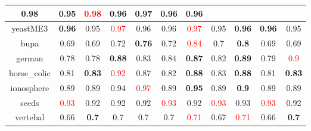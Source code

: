 \documentclass{article}%
\begin{document}
\begin{tabular}{c|cccccccccc}
{0.98
}&0.95&\textcolor{red}{ 
0.98
}&0.96&\textbf{0.97}&0.96&0.96\\%
\hline%
yeastME3&\textbf{0.96}&0.95&\textcolor{red}{ 
0.97
}&0.96&0.96&\textcolor{red}{ 
0.97
}&0.95&\textbf{0.96}&\textbf{0.96}&0.95\\%
\hline%
bupa&0.69&0.69&0.72&\textbf{0.76}&0.72&\textcolor{red}{ 
0.84
}&0.7&\textbf{0.8}&0.69&0.69\\%
\hline%
german&0.78&0.78&\textbf{0.88}&0.83&0.84&\textbf{0.87}&0.82&\textbf{0.89}&0.79&\textcolor{red}{ 
0.9
}\\%
\hline%
horse\_colic&0.81&\textbf{0.83}&\textcolor{red}{ 
0.92
}&0.87&0.82&\textbf{0.88}&0.83&\textbf{0.88}&0.81&\textbf{0.83}\\%
\hline%
ionosphere&0.89&0.89&0.94&\textcolor{red}{ 
0.97
}&0.89&\textbf{0.95}&0.89&\textbf{0.9}&0.89&0.89\\%
\hline%
seeds&\textcolor{red}{ 
0.93
}&0.92&0.92&0.92&\textcolor{red}{ 
0.93
}&0.92&\textcolor{red}{ 
0.93
}&0.93&\textcolor{red}{ 
0.93
}&0.92\\%
\hline%
vertebal&0.66&\textbf{0.7}&0.7&0.7&0.7&\textcolor{red}{ 
0.71
}&0.67&\textcolor{red}{ 
0.71
}&0.66&\textbf{0.7}\\%
\hline%
\end{tabular}

%
\end{document}
